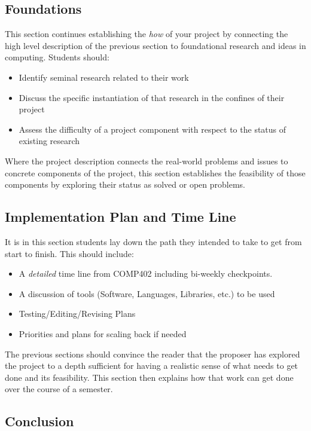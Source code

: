 \documentclass[nobib]{tufte-handout}
\begin{document}
\subsection{Foundations}

This section continues establishing the \textit{how} of your project by connecting the high level description of the previous section to foundational research and ideas in computing. Students should:
\begin{itemize}
\item Identify seminal research related to their work
\item Discuss the specific instantiation of that research in the confines of their project
\item Assess the difficulty of a project component with respect to the status of existing research
\end{itemize}
Where the project description connects the real-world problems and issues to concrete components of the project, this section establishes the feasibility of those components by exploring their status as solved or open problems.


\subsection{Implementation Plan and Time Line}

It is in this section students lay down the path they intended to take to get from start to finish. This should include:
\begin{itemize}
\item A \textit{detailed} time line from COMP402 including bi-weekly checkpoints.
\item A discussion of tools (Software, Languages, Libraries, etc.) to be used
\item Testing/Editing/Revising Plans
\item Priorities and plans for scaling back if needed
\end{itemize}
The previous sections should convince the reader that the proposer has explored the project to a depth sufficient for having a realistic sense of what needs to get done and its feasibility. This section then explains how that work can get done over the course of a semester.


\subsection{Conclusion}
\end{document}
